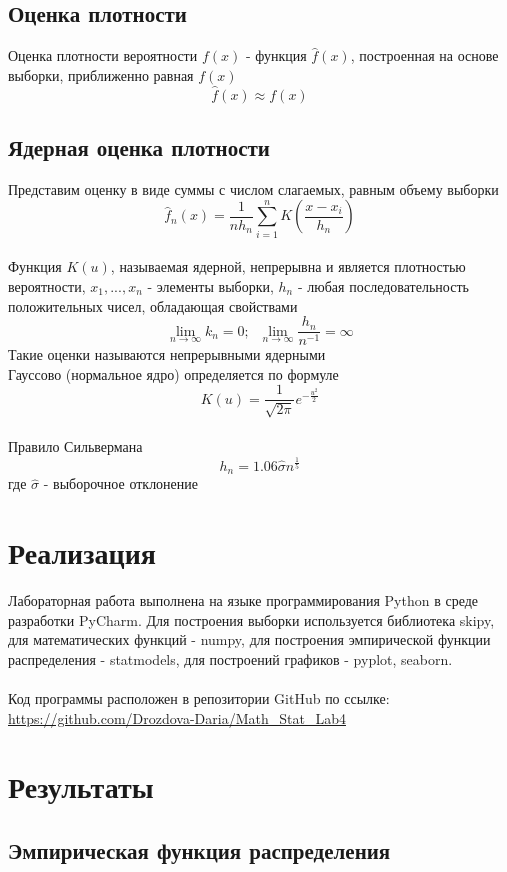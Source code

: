\documentclass{article}
\begin{document}
\subsection{Оценка плотности}

Оценка плотности вероятности $f(x)$ - функция $\hat{f}(x)$, построенная на основе выборки, приближенно равная $f(x)$
$$
\hat{f}(x) \approx f(x)
$$

\subsection{Ядерная оценка плотности}

Представим оценку в виде суммы с числом слагаемых, равным объему выборки
$$
\hat{f}_n(x) = \frac{1}{nh_n} \sum_{i=1}^n K \left( \frac{x-x_i}{h_n} \right)
$$
\\
Функция $K(u)$, называемая ядерной, непрерывна и является плотностью вероятности, $x_1,...,x_n$ - элементы выборки, ${h_n}$ - любая последовательность положительных чисел, обладающая свойствами 
$$
\lim_{n \to \infty} k_n = 0; \; \; \lim_{{n \to \infty}}\frac{h_n}{n^{-1}} = \infty
$$
Такие оценки называются непрерывными ядерными
\\
Гауссово (нормальное ядро) определяется по формуле
$$
K(u) = \frac{1}{\sqrt{2\pi}}e^{-\frac{u^2}{2}}
$$
\\
Правило Сильвермана 
$$
h_n = 1.06 \hat{\sigma} n^{\frac{1}{5}}
$$
где $\hat{\sigma}$ - выборочное отклонение

\newpage
\section{Реализация}

Лабораторная работа выполнена на языке программирования Python в среде разработки PyCharm. Для построения выборки используется библиотека skipy, для математических функций - numpy, для построения эмпирической функции распределения - statmodels, для построений графиков - pyplot, seaborn.
\\
\\
Код программы расположен в репозитории GitHub по ссылке: \url{https://github.com/Drozdova-Daria/Math_Stat_Lab4}

\newpage
\section{Результаты}

\subsection{Эмпирическая функция распределения}
\end{document}
